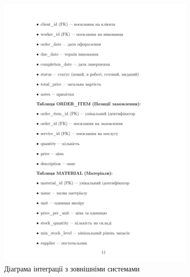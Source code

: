 \documentclass[14pt,a4paper]{extarticle}
\begin{document}
\begin{figure}[h!]
\centering
\includegraphics[width=0.85\textwidth]{diagrams/diagram-12.png}
\caption{Діаграма інтеграції з зовнішніми системами}
\end{figure}
\end{document}
